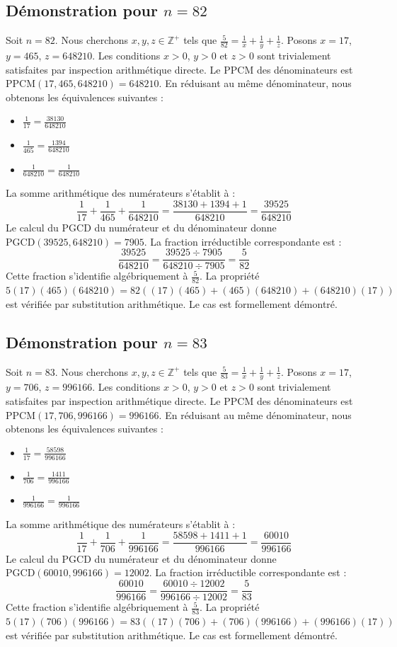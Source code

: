 \documentclass[12pt,a4paper]{article}
\begin{document}
\subsection{Démonstration pour $n = 82$}
Soit $n = 82$. Nous cherchons $x, y, z \in \mathbb{Z}^{+}$ tels que $\frac{5}{82} = \frac{1}{x} + \frac{1}{y} + \frac{1}{z}$.
Posons $x = 17$, $y = 465$, $z = 648210$.
Les conditions $x > 0$, $y > 0$ et $z > 0$ sont trivialement satisfaites par inspection arithmétique directe.
Le PPCM des dénominateurs est $\text{PPCM}(17, 465, 648210) = 648210$.
En réduisant au même dénominateur, nous obtenons les équivalences suivantes :
\begin{itemize}
    \item $\frac{1}{17} = \frac{38130}{648210}$
    \item $\frac{1}{465} = \frac{1394}{648210}$
    \item $\frac{1}{648210} = \frac{1}{648210}$
\end{itemize}
La somme arithmétique des numérateurs s'établit à :
$$ \frac{1}{17} + \frac{1}{465} + \frac{1}{648210} = \frac{38130 + 1394 + 1}{648210} = \frac{39525}{648210} $$
Le calcul du PGCD du numérateur et du dénominateur donne $\text{PGCD}(39525, 648210) = 7905$.
La fraction irréductible correspondante est :
$$ \frac{39525}{648210} = \frac{39525 \div 7905}{648210 \div 7905} = \frac{5}{82} $$
Cette fraction s'identifie algébriquement à $\frac{5}{82}$.
La propriété $5(17)(465)(648210) = 82((17)(465) + (465)(648210) + (648210)(17))$ est vérifiée par substitution arithmétique.
Le cas est formellement démontré.

\subsection{Démonstration pour $n = 83$}
Soit $n = 83$. Nous cherchons $x, y, z \in \mathbb{Z}^{+}$ tels que $\frac{5}{83} = \frac{1}{x} + \frac{1}{y} + \frac{1}{z}$.
Posons $x = 17$, $y = 706$, $z = 996166$.
Les conditions $x > 0$, $y > 0$ et $z > 0$ sont trivialement satisfaites par inspection arithmétique directe.
Le PPCM des dénominateurs est $\text{PPCM}(17, 706, 996166) = 996166$.
En réduisant au même dénominateur, nous obtenons les équivalences suivantes :
\begin{itemize}
    \item $\frac{1}{17} = \frac{58598}{996166}$
    \item $\frac{1}{706} = \frac{1411}{996166}$
    \item $\frac{1}{996166} = \frac{1}{996166}$
\end{itemize}
La somme arithmétique des numérateurs s'établit à :
$$ \frac{1}{17} + \frac{1}{706} + \frac{1}{996166} = \frac{58598 + 1411 + 1}{996166} = \frac{60010}{996166} $$
Le calcul du PGCD du numérateur et du dénominateur donne $\text{PGCD}(60010, 996166) = 12002$.
La fraction irréductible correspondante est :
$$ \frac{60010}{996166} = \frac{60010 \div 12002}{996166 \div 12002} = \frac{5}{83} $$
Cette fraction s'identifie algébriquement à $\frac{5}{83}$.
La propriété $5(17)(706)(996166) = 83((17)(706) + (706)(996166) + (996166)(17))$ est vérifiée par substitution arithmétique.
Le cas est formellement démontré.
\end{document}
